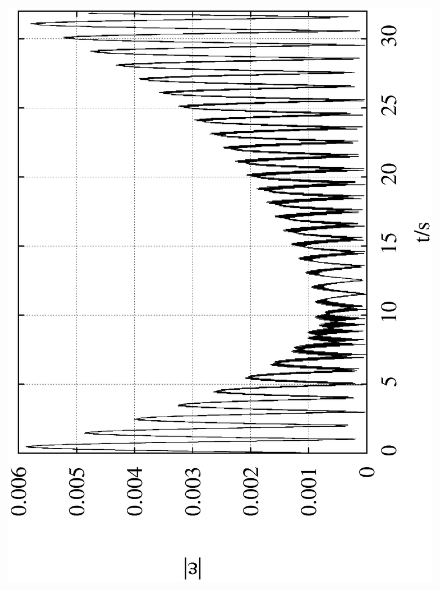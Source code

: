\documentclass[10pt,a4paper]{article}
\begin{document}
\begin{figure}[h!]
\begin{center}
\includegraphics[scale = 0.3, angle =-90]{./Leapfrog_0.1_1000_0.2.eps}

\end{center}
\end{figure}
\end{document}
